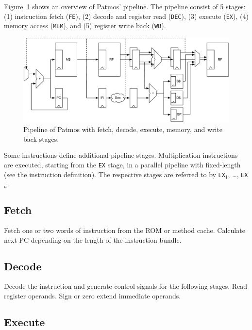 \documentclass[a4paper,fontsize=10pt,twoside,DIV15,BCOR12mm,headinclude=true,footinclude=false,pagesize,bibtotoc]{scrbook}
\newcommand{\todo}[1]{{\emph{TODO: #1}}}
\newcommand{\comment}[3]{

\textsf{\textbf{#1}} {\color{#3}#2}}
\newcommand{\martin}[1]{\comment{Martin}{#1}{Blue}}
\renewcommand{\martin}[1]{}
\begin{document}
Figure~\ref{fig:pipeline} shows an overview of Patmos' pipeline. The pipeline
consist of 5 stages: (1) instruction fetch (\texttt{FE}), (2) decode and
register read (\texttt{DEC}), (3) execute (\texttt{EX}), (4) memory access (\texttt{MEM}), and (5) register write  back (\texttt{WB}).

\begin{figure}
    \centering
    \includegraphics[width=\textwidth]{fig/pipeline}
    \caption{Pipeline of Patmos with fetch, decode, execute, memory, and write back stages.}\label{fig:pipeline}
\end{figure}

Some instructions define additional pipeline stages. Multiplication instructions
are executed, starting from the \texttt{EX} stage, in a parallel pipeline with
fixed-length (see the instruction definition). The respective stages are
referred to by \texttt{EX$_1$}, \dots, \texttt{EX$_n$}.

\martin{\todo{A more detailed description of the pipeline stages, as the individual
4 stage description is gone.} Here a start:}

\subsection{Fetch}

Fetch one or two words of instruction from the ROM or method cache.
Calculate next PC depending on the length of the instruction bundle.

\subsection{Decode}

Decode the instruction and generate control signals for the following stages.
Read register operands. Sign or zero extend immediate operands.

\subsection{Execute}
\end{document}
